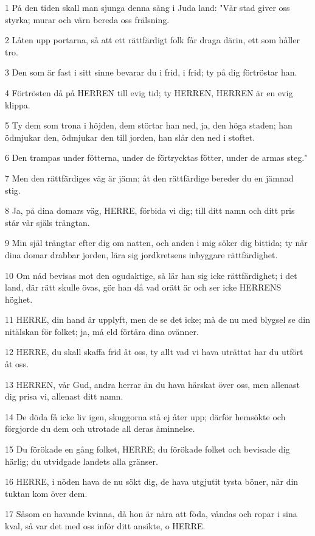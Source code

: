 \par 1 På den tiden skall man sjunga denna sång i Juda land: "Vår stad giver oss styrka; murar och värn bereda oss frälsning.
\par 2 Låten upp portarna, så att ett rättfärdigt folk får draga därin, ett som håller tro.
\par 3 Den som är fast i sitt sinne bevarar du i frid, i frid; ty på dig förtröstar han.
\par 4 Förtrösten då på HERREN till evig tid; ty HERREN, HERREN är en evig klippa.
\par 5 Ty dem som trona i höjden, dem störtar han ned, ja, den höga staden; han ödmjukar den, ödmjukar den till jorden, han slår den ned i stoftet.
\par 6 Den trampas under fötterna, under de förtrycktas fötter, under de armas steg."
\par 7 Men den rättfärdiges väg är jämn; åt den rättfärdige bereder du en jämnad stig.
\par 8 Ja, på dina domars väg, HERRE, förbida vi dig; till ditt namn och ditt pris står vår själs trängtan.
\par 9 Min själ trängtar efter dig om natten, och anden i mig söker dig bittida; ty när dina domar drabbar jorden, lära sig jordkretsens inbyggare rättfärdighet.
\par 10 Om nåd bevisas mot den ogudaktige, så lär han sig icke rättfärdighet; i det land, där rätt skulle övas, gör han då vad orätt är och ser icke HERRENS höghet.
\par 11 HERRE, din hand är upplyft, men de se det icke; må de nu med blygsel se din nitälskan för folket; ja, må eld förtära dina ovänner.
\par 12 HERRE, du skall skaffa frid åt oss, ty allt vad vi hava uträttat har du utfört åt oss.
\par 13 HERREN, vår Gud, andra herrar än du hava härskat över oss, men allenast dig prisa vi, allenast ditt namn.
\par 14 De döda få icke liv igen, skuggorna stå ej åter upp; därför hemsökte och förgjorde du dem och utrotade all deras åminnelse.
\par 15 Du förökade en gång folket, HERRE; du förökade folket och bevisade dig härlig; du utvidgade landets alla gränser.
\par 16 HERRE, i nöden hava de nu sökt dig, de hava utgjutit tysta böner, när din tuktan kom över dem.
\par 17 Såsom en havande kvinna, då hon är nära att föda, våndas och ropar i sina kval, så var det med oss inför ditt ansikte, o HERRE.
